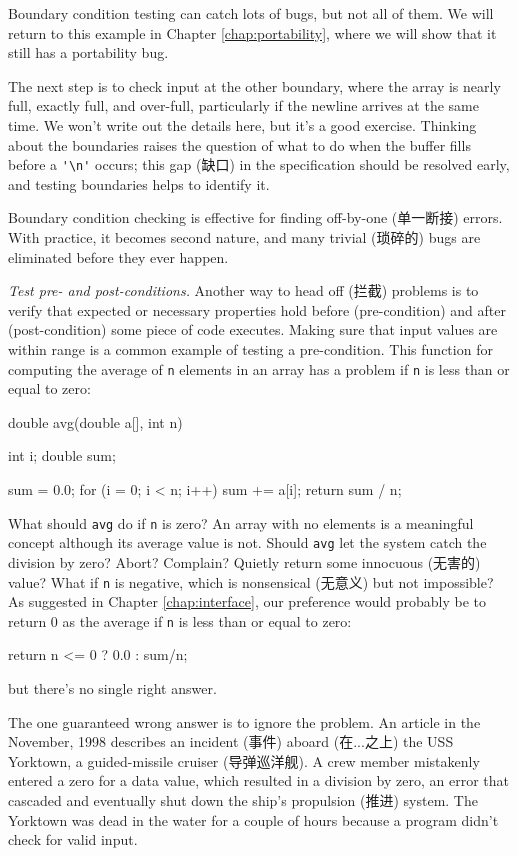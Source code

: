 Boundary condition testing can catch lots of bugs, but not all of them. We
will return to this example in Chapter \ref{chap:portability}, where we
will show that it still has a portability bug.

The next step is to check input at the other boundary, where the array is
nearly full, exactly full, and over-full, particularly if the newline
arrives at the same time.  We won't write out the details here, but it's a
good exercise. Thinking about the boundaries raises the question of what to
do when the buffer fills before a \verb"'\n'" occurs; this gap (缺口) in
the specification should be resolved early, and testing boundaries helps to
identify it.

Boundary condition checking is effective for finding off-by-one (单一断接)
errors.  With practice, it becomes second nature, and many trivial (琐碎的)
bugs are eliminated before they ever happen.

\emph{Test pre- and post-conditions.} Another way to head off (拦截)
problems is to verify that expected or necessary properties hold before
(pre-condition) and after (post-condition) some piece of code executes.
Making sure that input values are within range is a common example of
testing a pre-condition. This function for computing the average of
\verb'n' elements in an array has a problem if \verb'n' is less than or
equal to zero:
\begin{badcode}
    double avg(double a[], int n)
    {
        int     i;
        double  sum;

        sum = 0.0;
        for (i = 0; i < n; i++)
            sum += a[i];
        return sum / n;
    }
\end{badcode}

What should \verb'avg' do if \verb'n' is zero? An array with no elements is
a meaningful concept although its average value is not. Should \verb'avg'
let the system catch the division by zero? Abort? Complain? Quietly return
some innocuous (无害的) value? What if \verb'n' is negative, which is
nonsensical (无意义) but not impossible?  As suggested in Chapter
\ref{chap:interface}, our preference would probably be to return 0 as the
average if \verb'n' is less than or equal to zero:
\begin{wellcode}
    return n <= 0 ? 0.0 : sum/n;
\end{wellcode}
but there's no single right answer.

The one guaranteed wrong answer is to ignore the problem. An article in the
November, 1998  describes an incident (事件)
aboard (在...之上) the USS Yorktown, a guided-missile cruiser (导弹巡洋舰).
A crew member mistakenly entered a zero for a data value, which resulted in
a division by zero, an error that cascaded and eventually shut down the
ship's propulsion (推进) system. The Yorktown was dead in the water for a
couple of hours because a program didn't check for valid input.

